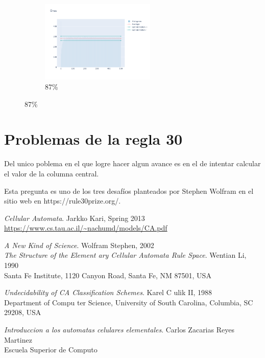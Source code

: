 \documentclass[12pt, fleqn]{report}                             %
\theoremstyle{break}                                            %
\begin{document}
\begin{figure}[ht!]
\begin{subfigure}[b]{0.4\linewidth}
          \includegraphics[width=0.6\textwidth]{Images/110/dia-d.png}
          \caption{87\%}
        \end{subfigure}
      \end{figure}

















\chapter{Problemas de la regla 30}

  Del unico poblema en el que logre hacer algun avance es en el de intentar calcular 
  el valor de la columna central.

  Esta pregunta es uno de los tres desafíos planteados por Stephen Wolfram en
  el sitio web en https://rule30prize.org/. 
  

  \clearpage




\begin{thebibliography}{10}

      \textit{Cellular Automata}. 
      Jarkko Kari, Spring 2013 \\
      \url{https://www.cs.tau.ac.il/~nachumd/models/CA.pdf}

      \textit{A New Kind of Science}. 
      Wolfram Stephen, 2002 \\

      \textit{The Structure of the Element ary
      Cellular Automata Rule Space}. 
      Wentian Li, 1990 \\
      Santa Fe Institute, 1120 Canyon Road, Santa Fe, NM 87501, USA

      \textit{Undecidability of CA Classification Schemes}. 
      Karel C ulik II, 1988 \\
      Department of Compu ter Science, University of South Carolina,
Columbia, SC 29208, USA


\textit{Introduccion a los automatas celulares elementales}. 
Carlos Zacarias Reyes Martinez \\
Escuela Superior de Computo

\end{thebibliography}
\end{document}
